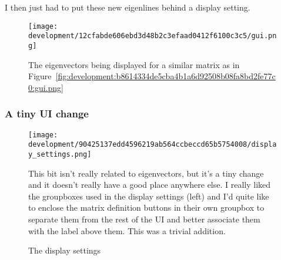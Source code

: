 \documentclass[../development.tex]{subfiles}
\begin{document}

I then just had to put these new eigenlines behind a display setting.




\begin{figure}[H]
	\centering
	\texttt{[image: development/12cfabde606ebd3d48b2c3efaad0412f6100c3c5/gui.png]}
	\caption{The eigenvectors being displayed for a similar matrix as in Figure~\ref{fig:development:b8614334de5cba4b1a6d92508b08fa8bd2fe77c0:gui.png}}
	\label{fig:development:12cfabde606ebd3d48b2c3efaad0412f6100c3c5:gui.png}
\end{figure}

\subsubsection{A tiny UI change\label{development:implementing-eigenstuffs:a-tiny-ui-change}}

\begin{figure}[H]
	\begin{minipage}{0.35\linewidth}
		\centering
		\texttt{[image: development/90425137edd4596219ab564ccbeccd65b5754008/display\_settings.png]}
		\caption{The display settings}
		\label{fig:development:90425137edd4596219ab564ccbeccd65b5754008:display_settings.png}
	\end{minipage}\hfill
	\begin{minipage}{0.6\linewidth}\setspacing
		This bit isn't really related to eigenvectors, but it's a tiny change and it doesn't really have a good place anywhere else. I really liked the groupboxes used in the display settings (left) and I'd quite like to enclose the matrix definition buttons in their own groupbox to separate them from the rest of the UI and better associate them with the label above them. This was a trivial addition.
	\end{minipage}
	\vspace{-1em}
\end{figure}

\end{document}
